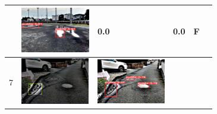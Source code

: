 \documentclass[10pt]{jarticle}
\begin{document}
\begin{table}[H]
\begin{tabular}{|l|l|l|l|l|l|}
\begin{minipage}{.1\textwidth}
           \end{minipage}       & \begin{minipage}{.1\textwidth}
            \centering
            \includegraphics[width=0.9\linewidth]{./fig/2tab6_r.png}
           \end{minipage}       & 0.0 & 0.0 & F      \\ \hline
        7  & \begin{minipage}{.1\textwidth}
            \centering
            \includegraphics[width=0.9\linewidth]{./fig/2tab7_a.png}
           \end{minipage}       & \begin{minipage}{.1\textwidth}
            \centering
            \includegraphics[width=0.9\linewidth]{./fig/2tab7_r.png}

\end{minipage}
\end{tabular}
\end{table}
\end{document}
